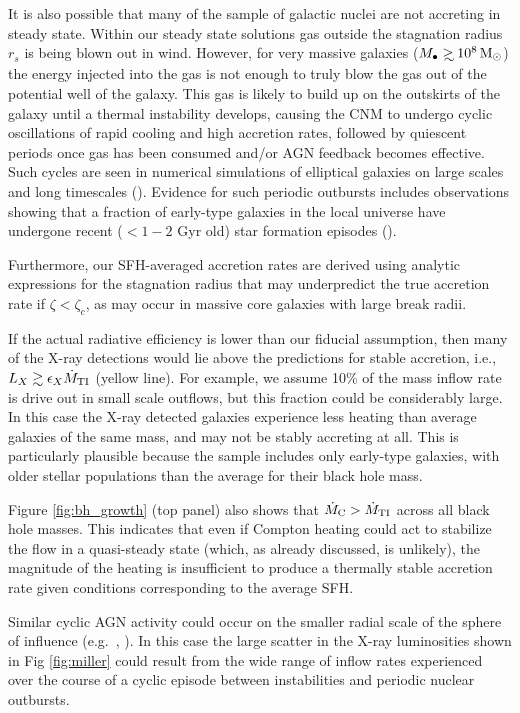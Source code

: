 \documentclass[usenatbib,fleqn]{mn2e}
\newcommand\gsim{\mathrel{\rlap{\lower4pt\hbox{\hskip1pt$\sim$}}
    \raise1pt\hbox{$>$}}}
\newcommand{\rs}{r_s}
\newcommand{\Mbh}[1][]{M_{\bullet#1}}
\begin{document}
It is also possible that many of the \citet{Miller+15} sample of
galactic nuclei are not accreting in steady state. Within our steady
state solutions gas outside the stagnation radius $\rs$ is being blown
out in wind. However, for very massive galaxies ($\Mbh\gsim 10^8
\Msun$) the energy injected into the gas is not enough to truly blow
the gas out of the potential well of the galaxy. This gas is likely to
build up on the outskirts of the galaxy until a thermal instability
develops, causing the CNM to undergo cyclic oscillations of rapid
cooling and high accretion rates, followed by quiescent periods once
gas has been consumed and/or AGN feedback becomes effective. Such
cycles are seen in numerical simulations of elliptical galaxies on
large scales and long timescales (\citealt{Ciotti+10}).  Evidence for
such periodic outbursts includes observations showing that a fraction
of early-type galaxies in the local universe have undergone recent ($<
1-2$ Gyr old) star formation episodes (\citealt{Donas+07}).

 
Furthermore, our SFH-averaged accretion rates are derived using
analytic expressions for the stagnation radius that may underpredict
the true accretion rate if $\zeta < \zeta_c$, as may occur in massive
core galaxies with large break radii.

If the actual radiative efficiency is lower than our fiducial
assumption, then many of the X-ray detections would lie above the
predictions for stable accretion, i.e., $L_X \gtrsim \epsilon_X
\dot{M}_{\rm TI}$ (yellow line).  For example, we assume 10\% 
of the mass inflow rate is drive out in small scale outflows, but this
fraction could be considerably large. In this case the X-ray detected
galaxies experience less heating than average galaxies of the same
mass, and may not be stably accreting at all.  This is particularly
plausible because the \citet{Miller+15} sample includes only
early-type galaxies, with older stellar populations than the average
for their black hole mass.

Figure \ref{fig:bh_growth} (top panel) also shows that $\dot{M}_{\rm
  C} > \dot{M}_{\rm TI}$ across all black hole masses.  This indicates
that even if Compton heating could act to stabilize the flow in a
quasi-steady state (which, as already discussed, is unlikely), the
magnitude of the heating is insufficient to produce a thermally stable
accretion rate given conditions corresponding to the average SFH.


Similar cyclic AGN activity could occur on the smaller radial scale of
the sphere of influence (e.g.~\citealt{Yuan&Li11},
\citealt{Cuadra+15}).  In this case the large scatter in the X-ray
luminosities shown in Fig \ref{fig:miller} could result from the wide
range of inflow rates experienced over the course of a cyclic episode
between instabilities and periodic nuclear outbursts. 
\end{document}
